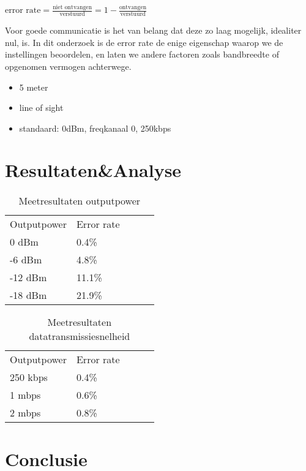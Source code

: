 \documentclass[a4paper,10pt]{article}
\begin{document}
\begin{math}
	\text{error rate} = \frac{\text{niet ontvangen}}{\text{verstuurd}} = 1 - \frac{\text{ontvangen}}{\text{verstuurd}} 
\end{math}

Voor goede communicatie is het van belang dat deze zo laag mogelijk, idealiter nul, is. In dit onderzoek is de error rate de enige eigenschap waarop we de instellingen beoordelen, en laten we andere factoren zoals bandbreedte of opgenomen vermogen achterwege.

\begin{itemize}
	\item 5 meter
	\item line of sight
	\item standaard: 0dBm, freqkanaal 0, 250kbps
\end{itemize}

\section{Resultaten\&Analyse}

\begin{table}[h]
	\caption{Meetresultaten outputpower}
	\begin{tabular}{lllll}
	Outputpower &  Error rate  	\\
	0 dBm       &  0.4\% 		\\
	-6 dBm      &  4.8\% 		\\
	-12 dBm     &  11.1\% 		\\
	-18 dBm     &  21.9\%
	\end{tabular}
\end{table}

\begin{table}[h]
	\caption{Meetresultaten datatransmissiesnelheid}
	\begin{tabular}{lllll}
	Outputpower &  Error rate  	\\
	250 kbps    &  0.4\% 		\\
	1 mbps      &  0.6\% 		\\
	2 mbps      &  0.8\%
	\end{tabular}
\end{table}

\section{Conclusie}
\end{document}
